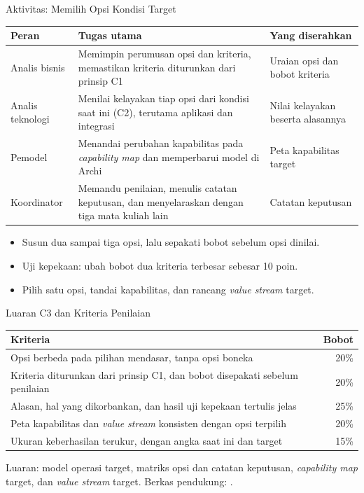 \documentclass[aspectratio=169, table, 12pt]{beamer}
\begin{document}
\begin{frame}{{\Large Aktivitas: Memilih Opsi Kondisi Target}}
  \scriptsize
  \begin{tabularx}{\textwidth}{l>{\raggedright\arraybackslash}X>{\raggedright\arraybackslash}p{3.4cm}}
    \hline
    \textbf{Peran} & \textbf{Tugas utama} & \textbf{Yang diserahkan} \\
    \hline
    Analis bisnis & Memimpin perumusan opsi dan kriteria, memastikan kriteria diturunkan
      dari prinsip C1 & Uraian opsi dan bobot kriteria \\
    \hline
    Analis teknologi & Menilai kelayakan tiap opsi dari kondisi saat ini (C2), terutama
      aplikasi dan integrasi & Nilai kelayakan beserta alasannya \\
    \hline
    Pemodel & Menandai perubahan kapabilitas pada \textit{capability map} dan memperbarui
      model di Archi & Peta kapabilitas target \\
    \hline
    Koordinator & Memandu penilaian, menulis catatan keputusan, dan menyelaraskan dengan
      tiga mata kuliah lain & Catatan keputusan \\
    \hline
  \end{tabularx}

  \vspace{4pt}
  \small
  \begin{itemize}
    \item Susun dua sampai tiga opsi, lalu sepakati bobot sebelum opsi dinilai.
    \item Uji kepekaan: ubah bobot dua kriteria terbesar sebesar 10 poin.
    \item Pilih satu opsi, tandai kapabilitas, dan rancang \textit{value stream} target.
  \end{itemize}
\end{frame}

\begin{frame}{{\Large Luaran C3 dan Kriteria Penilaian}}
  \footnotesize
  \begin{tabularx}{\textwidth}{>{\raggedright\arraybackslash}Xr}
    \hline
    \textbf{Kriteria} & \textbf{Bobot} \\
    \hline
    Opsi berbeda pada pilihan mendasar, tanpa opsi boneka & 20\% \\
    \hline
    Kriteria diturunkan dari prinsip C1, dan bobot disepakati sebelum penilaian & 20\% \\
    \hline
    Alasan, hal yang dikorbankan, dan hasil uji kepekaan tertulis jelas & 25\% \\
    \hline
    Peta kapabilitas dan \textit{value stream} konsisten dengan opsi terpilih & 20\% \\
    \hline
    Ukuran keberhasilan terukur, dengan angka saat ini dan target & 15\% \\
    \hline
  \end{tabularx}

  \vspace{8pt}
  \small Luaran: model operasi target, matriks opsi dan catatan keputusan, \textit{capability map} target,
  dan \textit{value stream} target. Berkas pendukung: .
\end{frame}
\end{document}
